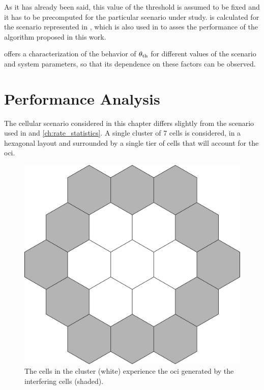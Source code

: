 As it has already been said, this value of the threshold is assumed to be fixed
and it has to be precomputed for the particular scenario under study.
 is calculated for the scenario represented in
, which is also used in
 to asses the performance of the algorithm proposed
in this work.

 offers a characterization of the behavior of $\theta_{\text{th}}$ for
different values of the scenario and system parameters, so that its dependence
on these factors can be observed.

\section{Performance Analysis}\label{sec:sched_performance}

The cellular scenario considered in this chapter differs slightly from the
scenario used in  and \ref{ch:rate_statistics}. A single
cluster of 7 cells is considered, in a hexagonal layout and surrounded by a
single tier of cells that will account for the \gls{oci}.

\begin{figure}[t]
    \centering
    \includegraphics[width=0.75\columnwidth]{./12.simple_threshold_scheduling/figure/scenario}
    \caption{The cells in the cluster (white) experience the \gls{oci} generated
    by the interfering cells (shaded).}
    \label{fig:scenario_threshold}
\end{figure}

